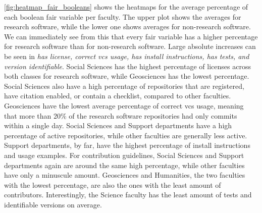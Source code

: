 \autoref{fig:heatmap_fair_booleans} shows the heatmaps for the average percentage of each boolean \acrshort{fair} variable per faculty. The upper plot shows the averages for research software, while the lower one shows averages for non-research software. We can immediately see from this that every \acrshort{fair} variable has a higher percentage for research software than for non-research software. Large absolute increases can be seen in \textit{has license, correct vcs usage, has install instructions, has tests, and version identifiable}. 
Social Sciences has the highest percentage of licenses across both classes for research software, while Geosciences has the lowest percentage. Social Sciences also have a high percentage of repositories that are registered, have citation enabled, or contain a checklist, compared to other faculties. Geosciences have the lowest average percentage of correct vcs usage, meaning that more than 20\% of the research software repositories had only commits within a single day. Social Sciences and Support departments have a high percentage of active repositories, while other faculties are generally less active. Support departments, by far, have the highest percentage of install instructions and usage examples. For contribution guidelines, Social Sciences and Support departments again are around the same high percentage, while other faculties have only a minuscule amount. Geosciences and Humanities, the two faculties with the lowest percentage, are also the ones with the least amount of contributors. Interestingly, the Science faculty has the least amount of tests and identifiable versions on average.

